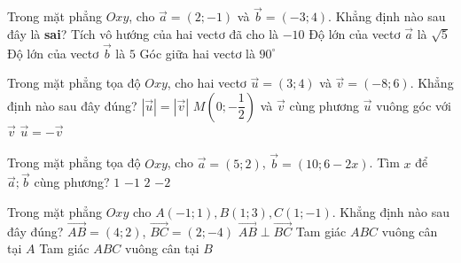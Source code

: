 \begin{ex}%
	Trong mặt phẳng $Oxy$, cho $\overrightarrow{a} = \left(2; -1\right)$ và $\overrightarrow{b} = \left(-3; 4\right)$. Khẳng định nào sau đây là \textbf{sai}?
	\choice
	{Tích vô hướng của hai vectơ đã cho là $-10$}
	{Độ lớn của vectơ $\overrightarrow{a}$ là $\sqrt{5}$}
	{Độ lớn của vectơ $\overrightarrow{b}$ là $5$}
	{\True Góc giữa hai vectơ là $90^\circ$}
\end{ex}
\begin{ex}%
	Trong mặt phẳng tọa độ $Oxy$, cho hai vectơ $\overrightarrow{u} = \left(3; 4\right)$ và $\overrightarrow{v} = \left(-8; 6\right)$. Khẳng định nào sau đây đúng?
	\choice
	{$\left|\overrightarrow{u}\right| = \left|\overrightarrow{v}\right|$}
	{$M\left(0; -\dfrac{1}
	{2}\right)$ và $\overrightarrow{v}$ cùng phương}
	{\True $\overrightarrow{u}$ vuông góc với $\overrightarrow{v}$}
	{$\overrightarrow{u} = -\overrightarrow{v}$}
\end{ex}
\begin{ex}%
	Trong mặt phẳng tọa độ $Oxy$, cho $\overrightarrow{a} = \left(5; 2\right)$, $\overrightarrow{b} = \left(10; 6-2x\right)$. Tìm $x$ để $\overrightarrow{a}; \overrightarrow{b}$ cùng phương?
	\choice
	{\True $1$}
	{$-1$}
	{$2$}
	{$-2$}
\end{ex}
\begin{ex}%
	Trong mặt phẳng $Oxy$ cho $A\left(-1; 1\right), B\left(1; 3\right), C\left(1; -1\right)$. Khẳng định nào sau đây đúng?
	\choice
	{$\overrightarrow{AB} = \left(4; 2\right)$, $ \overrightarrow{BC} = \left(2; -4\right)$}
	{$\overrightarrow{AB} \perp \overrightarrow{BC}$}
	{\True Tam giác $ABC$ vuông cân tại $A$}
	{Tam giác $ABC$ vuông cân tại $B$}
\end{ex}
